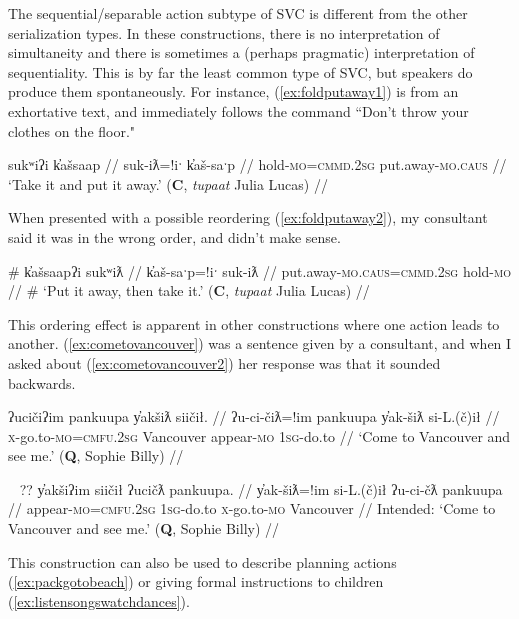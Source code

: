The sequential/separable action subtype of SVC is different from the other serialization types. In these constructions, there is no interpretation of simultaneity and there is sometimes a (perhaps pragmatic) interpretation of sequentiality. This is by far the least common type of SVC, but speakers do produce them spontaneously. For instance, (\ref{ex:foldputaway1}) is from an exhortative text, and immediately follows the command ``Don't throw your clothes on the floor."

\ex \label{ex:foldputaway1}
\begingl
\glpreamble sukʷiʔi k̓ašsaap //
\gla suk-iƛ=!iˑ k̓aš-saˑp //
\glb hold-\textsc{mo}=\textsc{cmmd.2sg} put.away-\textsc{mo.caus} //
\glft `Take it and put it away.' (\textbf{C}, \textit{tupaat} Julia Lucas) //
\endgl
\xe

When presented with a possible reordering (\ref{ex:foldputaway2}), my consultant said it was in the wrong order, and didn't make sense.

\ex \label{ex:foldputaway2}
\begingl
\glpreamble \# k̓ašsaapʔi sukʷiƛ //
\gla k̓aš-saˑp=!iˑ suk-iƛ //
\glb put.away-\textsc{mo.caus}=\textsc{cmmd.2sg} hold-\textsc{mo} //
\glft \# `Put it away, then take it.' (\textbf{C}, \textit{tupaat} Julia Lucas) //
\endgl
\xe

This ordering effect is apparent in other constructions where one action leads to another. (\ref{ex:cometovancouver}) was a sentence given by a consultant, and when I asked about (\ref{ex:cometovancouver2}) her response was that it sounded backwards.

\ex \label{ex:cometovancouver}
\begingl
\glpreamble ʔucičiʔim pankuupa y̓akšiƛ siičił. //
\gla ʔu-ci-čiƛ=!im pankuupa y̓ak-šiƛ si-L.(č)ił //
\glb \textsc{x}-go.to-\textsc{mo}=\textsc{cmfu.2sg} Vancouver appear-\textsc{mo} \textsc{1sg}-do.to //
\glft `Come to Vancouver and see me.' (\textbf{Q}, Sophie Billy) //
\endgl
\xe

\ex~ \label{ex:cometovancouver2}
\begingl
\glpreamble ?? y̓akšiʔim siičił ʔucičƛ pankuupa. //
\gla y̓ak-šiƛ=!im si-L.(č)ił ʔu-ci-čƛ pankuupa //
\glb appear-\textsc{mo}=\textsc{cmfu.2sg} \textsc{1sg}-do.to \textsc{x}-go.to-\textsc{mo} Vancouver //
\glft Intended: `Come to Vancouver and see me.' (\textbf{Q}, Sophie Billy) //
\endgl
\xe

This construction can also be used to describe planning actions (\ref{ex:packgotobeach}) or giving formal instructions to children (\ref{ex:listensongswatchdances}).

